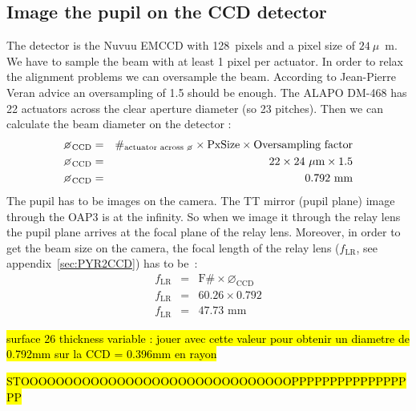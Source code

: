 \documentclass[12pt,a4paper]{article}
\begin{document}
\subsection{Image the pupil on the CCD detector}\label{subsec:4eme_partie}
The detector is the Nuvuu EMCCD with 128~pixels and a pixel size of $24~\mu$~m. We have to sample the beam with at least 1 pixel per actuator. In order to relax the alignment problems we can oversample the beam. According to Jean-Pierre Veran advice an oversampling of 1.5 should be enough. The ALAPO DM-468 has 22 actuators across the clear aperture diameter (so 23 pitches). Then we can calculate the beam diameter on the detector :
\begin{eqnarray}
	\diameter_{\text{CCD}} &= &\#_{\text{actuator across \diameter}}\times \text{PxSize}\times\text{Oversampling factor}\\
	\diameter_{\text{CCD}} &= &22\times 24~\mu\text{m}\times 1.5\\
	\diameter_{\text{CCD}} &= &0.792\,\,\text{mm}
\end{eqnarray}
The pupil has to be images on the camera. The TT mirror (pupil plane) image through the OAP3 is at the infinity. So when we image it through the relay lens the pupil plane arrives at the focal plane of the relay lens. Moreover, in order to get the beam size on the camera, the focal length of the relay lens ($f_{\text{LR}}$, see appendix~\ref{sec:PYR2CCD}) has to be~:
\begin{eqnarray}
	f_{\text{LR}} &= &\text{F}\# \times \diameter_{\text{CCD}}\\
	f_{\text{LR}} &= &60.26\times 0.792\\
	f_{\text{LR}} &= &47.73\,\,\text{mm}
\end{eqnarray}

\hl{surface 26 thickness variable : jouer avec cette valeur pour obtenir un diametre de 0.792mm sur la CCD = 0.396mm en rayon\\}

\hl{STOOOOOOOOOOOOOOOOOOOOOOOOOOOOOOOPPPPPPPPPPPPPPPPP}
\end{document}
